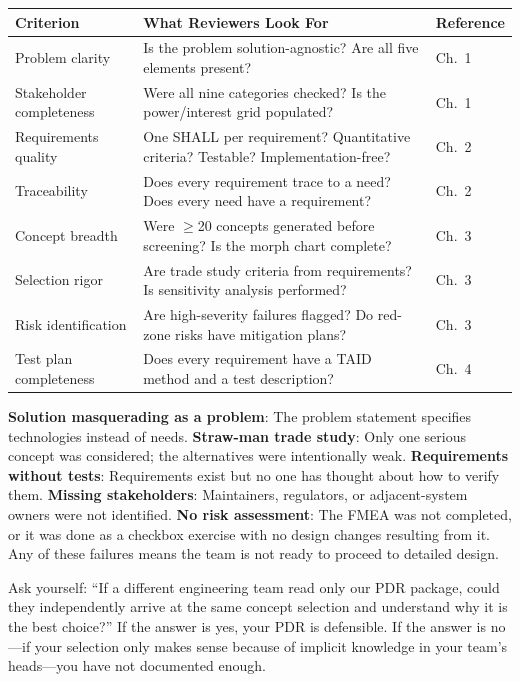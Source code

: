\documentclass[11pt,letterpaper,twoside,openany]{book}
\begin{document}
\begin{center}
\small
\begin{tabularx}{\textwidth}{l X l}
\toprule
\textbf{Criterion} & \textbf{What Reviewers Look For} & \textbf{Reference} \\
\midrule
Problem clarity & Is the problem solution-agnostic? Are all five elements present? & Ch.~1 \\
Stakeholder completeness & Were all nine categories checked? Is the power/interest grid populated? & Ch.~1 \\
Requirements quality & One SHALL per requirement? Quantitative criteria? Testable? Implementation-free? & Ch.~2 \\
Traceability & Does every requirement trace to a need? Does every need have a requirement? & Ch.~2 \\
Concept breadth & Were $\geq$20 concepts generated before screening? Is the morph chart complete? & Ch.~3 \\
Selection rigor & Are trade study criteria from requirements? Is sensitivity analysis performed? & Ch.~3 \\
Risk identification & Are high-severity failures flagged? Do red-zone risks have mitigation plans? & Ch.~3 \\
Test plan completeness & Does every requirement have a TAID method and a test description? & Ch.~4 \\
\bottomrule
\end{tabularx}
\end{center}

\begin{warningbox}
\textbf{Solution masquerading as a problem}: The problem statement specifies technologies instead of needs. \textbf{Straw-man trade study}: Only one serious concept was considered; the alternatives were intentionally weak. \textbf{Requirements without tests}: Requirements exist but no one has thought about how to verify them. \textbf{Missing stakeholders}: Maintainers, regulators, or adjacent-system owners were not identified. \textbf{No risk assessment}: The FMEA was not completed, or it was done as a checkbox exercise with no design changes resulting from it. Any of these failures means the team is not ready to proceed to detailed design.
\end{warningbox}

\begin{tipbox}
Ask yourself: ``If a different engineering team read only our PDR package, could they independently arrive at the same concept selection and understand why it is the best choice?'' If the answer is yes, your PDR is defensible. If the answer is no---if your selection only makes sense because of implicit knowledge in your team's heads---you have not documented enough.
\end{tipbox}
\end{document}
